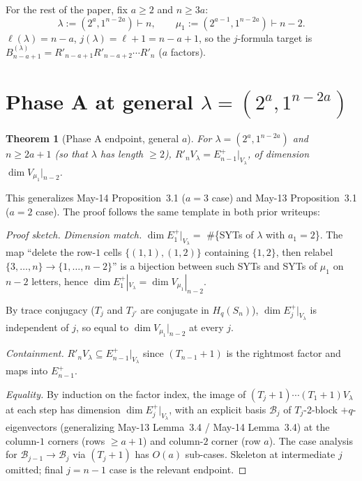 \documentclass[11pt]{article}
\newtheorem{theorem}{Theorem}
\theoremstyle{definition}
\begin{document}
For the rest of the paper, fix $a\ge 2$ and $n\ge 3a$:
\[
   \lambda:=(2^a,1^{n-2a})\vdash n,
   \qquad
   \mu_1:=(2^{a-1},1^{n-2a})\vdash n-2.
\]
$\ell(\lambda)=n-a$, $j(\lambda)=\ell+1=n-a+1$, so the $j$-formula
target is
$B_{n-a+1}^{(\lambda)}=R'_{n-a+1}R'_{n-a+2}\cdots R'_n$ ($a$ factors).

\section{Phase A at general $\lambda=(2^a,1^{n-2a})$}\label{sec:phaseA}

\begin{theorem}[Phase A endpoint, general $a$]\label{thm:phaseA}
For $\lambda=(2^a,1^{n-2a})$ and $n\ge 2a+1$ (so that $\lambda$ has
length $\ge 2$), $R'_n V_\lambda=E_{n-1}^+|_{V_\lambda}$, of
dimension $\dim V_{\mu_1}|_{n-2}$.
\end{theorem}

This generalizes May-14 Proposition~3.1 ($a=3$ case) and May-13
Proposition~3.1 ($a=2$ case).  The proof follows the same template
in both prior writeups:

\begin{proof}[Proof sketch]
\emph{Dimension match.}  $\dim E_1^+|_{V_\lambda}=$ \#\{SYTs of
$\lambda$ with $a_1=2$\}.  The map ``delete the row-$1$ cells
$\{(1,1),(1,2)\}$ containing $\{1,2\}$, then relabel
$\{3,\ldots,n\}\to\{1,\ldots,n-2\}$'' is a bijection between such
SYTs and SYTs of $\mu_1$ on $n-2$ letters, hence
$\dim E_1^+|_{V_\lambda}=\dim V_{\mu_1}|_{n-2}$.

By trace conjugacy ($T_j$ and $T_{j'}$ are conjugate in $H_q(S_n)$),
$\dim E_j^+|_{V_\lambda}$ is independent of $j$, so equal to
$\dim V_{\mu_1}|_{n-2}$ at every $j$.

\emph{Containment.}  $R'_n V_\lambda\subseteq E_{n-1}^+|_{V_\lambda}$
since $(T_{n-1}{+}1)$ is the rightmost factor and maps into
$E_{n-1}^+$.

\emph{Equality.}  By induction on the factor index, the image of
$(T_j{+}1)\cdots(T_1{+}1)V_\lambda$ at each step has dimension
$\dim E_j^+|_{V_\lambda}$, with an explicit basis $\mathcal{B}_j$
of $T_j$-2-block $+q$-eigenvectors (generalizing May-13
Lemma~3.4 / May-14 Lemma~3.4) at the column-$1$ corners (rows
$\ge a+1$) and column-$2$ corner (row $a$).  The case analysis
for $\mathcal{B}_{j-1}\to\mathcal{B}_j$ via $(T_j{+}1)$ has $O(a)$
sub-cases.  Skeleton at intermediate $j$ omitted; final
$j=n-1$ case is the relevant endpoint.
\end{proof}
\end{document}
